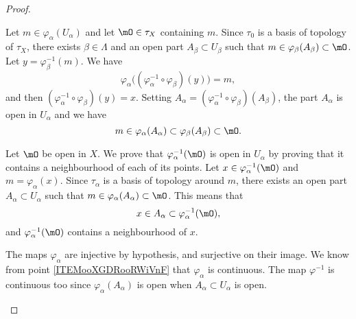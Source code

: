\begin{proof}
\begin{subproof}

		Let \( m\in \varphi_{\alpha}(U_{\alpha})\) and let \( \mO\in\tau_X\) containing \( m\). Since \( \tau_0\) is a basis of topology of \( \tau_X\), there exists \( \beta\in\Lambda\) and an open part \( A_{\beta}\subset U_{\beta}\) such that \( m\in\varphi_{\beta}(A_{\beta})\subset\mO\). Let \( y=\varphi_{\beta}^{-1}(m)\). We have
		\begin{equation}
			\varphi_{\alpha}\big( (\varphi_{\alpha}^{-1}\circ\varphi_{\beta})(y) \big)=m,
		\end{equation}
		and then \( (\varphi_{\alpha}^{-1}\circ\varphi_{\beta})(y)=x\). Setting \( A_{\alpha}=(\varphi_{\alpha}^{-1}\circ\varphi_{\beta})(A_{\beta})\), the part \( A_{\alpha}\) is open in \( U_{\alpha}\) and we have
		\begin{equation}
			m\in\varphi_{\alpha}(A_{\alpha})\subset\varphi_{\beta}(A_{\beta})\subset\mO.
		\end{equation}


		Let \( \mO\) be open in \( X\). We prove that \( \varphi_{\alpha}^{-1}(\mO)\) is open in \( U_{\alpha}\) by proving that it contains a neighbourhood of each of its points. Let \( x\in\varphi_{\alpha}^{-1}(\mO)\) and \( m=\varphi_{\alpha}(x)\). Since \( \tau_{\alpha}\) is a basis of topology around \( m\), there exists an open part \( A_{\alpha}\subset U_{\alpha}\) such that \( m\in\varphi_{\alpha}(A_{\alpha})\subset\mO\). This means that
		\begin{equation}
			x\in A_{\alpha}\subset\varphi_{\alpha}^{-1}(\mO),
		\end{equation}
		and \( \varphi_{\alpha}^{-1}(\mO)\) contains a neighbourhood of \( x\).

		The maps \( \varphi_{\alpha}\) are injective by hypothesis, and surjective on their image. We know from point \ref{ITEMooXGDRooRWiVnF} that \( \varphi_{\alpha}\) is continuous. The map \( \varphi^{-1}\) is continuous too since \( \varphi_{\alpha}(A_{\alpha})\) is open when \( A_{\alpha}\subset U_{\alpha}\) is open.


\end{subproof}
\end{proof}
